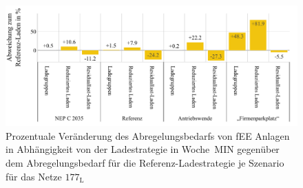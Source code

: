 \begin{figure}[H]
    \centering
    \includegraphics[width=\textwidth]{Bilder/177_cur_fee_grid_week_A}
    \caption[Prozentuale Veränderung des Abregelungsbedarfs von fEE Anlagen in Abhängigkeit von der Ladestrategie in Woche~MIN gegenüber dem Abregelungsbedarf für die Referenz-Ladestrategie je Szenario für das Netze \num{177}]{Prozentuale Veränderung des Abregelungsbedarfs von fEE Anlagen in Abhängigkeit von der Ladestrategie in Woche~MIN gegenüber dem Abregelungsbedarf für die Referenz-Ladestrategie je Szenario für das Netze \(177_{\text{L}}\)}\label{fig:177_cur_fee_grid_week_A}
\end{figure}